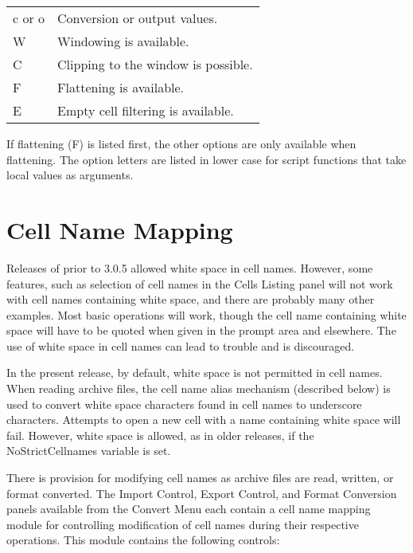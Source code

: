 \begin{enumerate}
{\begin{tabular}{ll}
c or o & Conversion or output values.\\
W      & Windowing is available.\\
C      & Clipping to the window is possible.\\
F      & Flattening is available.\\
E      & Empty cell filtering is available.\\
\end{tabular}

If flattening (F) is listed first, the other options are only
available when flattening.  The option letters are listed in lower
case for script functions that take local values as arguments.}
\end{enumerate}


\section{Cell Name Mapping}
\label{cellname}

Releases of {\Xic} prior to 3.0.5 allowed white space in cell names. 
However, some {\Xic} features, such as selection of cell names in the
{\cb Cells Listing} panel will not work with cell names containing
white space, and there are probably many other examples.  Most basic
operations will work, though the cell name containing white space will
have to be quoted when given in the prompt area and elsewhere.  The
use of white space in cell names can lead to trouble and is
discouraged.

In the present release, by default, white space is not permitted in
cell names.  When reading archive files, the cell name alias mechanism
(described below) is used to convert white space characters found in
cell names to underscore characters.  Attempts to open a new cell with
a name containing white space will fail.  However, white space is
allowed, as in older {\Xic} releases, if the {\et NoStrictCellnames}
variable is set.

There is provision for modifying cell names as archive files are read,
written, or format converted.  The {\cb Import Control}, {\cb Export
Control}, and {\cb Format Conversion} panels available from the {\cb
Convert Menu} each contain a cell name mapping module for controlling
modification of cell names during their respective operations.  This
module contains the following controls:

